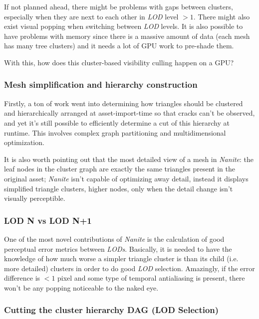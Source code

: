 \documentclass[10pt,journal,compsoc]{IEEEtran}
\begin{document}
\par If not planned ahead, there might be problems with gaps between clusters, especially when they are next to each other in \textit{LOD} level $>1$. There might also exist visual popping when switching between \textit{LOD} levels. It is also possible to have problems with memory since there is a massive amount of data (each mesh has many tree clusters) and it needs a lot of GPU work to pre-shade them. 
\par With this, how does this cluster-based visibility culling happen on a GPU?

\subsubsection{Mesh simplification and hierarchy construction}

\par Firstly, a ton of work went into determining how triangles should be clustered and hierarchically arranged at asset-import-time so that cracks can't be observed, and yet it's still possible to efficiently determine a cut of this hierarchy at runtime. This involves complex graph partitioning and multidimensional optimization. 

\par It is also worth pointing out that the most detailed view of a mesh in \textit{Nanite}: the leaf nodes in the cluster graph are exactly the same triangles present in the original asset; \textit{Nanite} isn't capable of optimizing away detail, instead it displays simplified triangle clusters, higher nodes, only when the detail change isn't visually perceptible.

\subsubsection{LOD N vs LOD N+1}

\par One of the most novel contributions of \textit{Nanite} is the calculation of good perceptual error metrics between \textit{LODs}. Basically, it is needed to have the knowledge of how much worse a simpler triangle cluster is than its child (i.e. more detailed) clusters in order to do good \textit{LOD} selection. Amazingly, if the error difference is $<1$ pixel and some type of temporal antialiasing is present, there won't be any popping noticeable to the naked eye.

\subsubsection{Cutting the cluster hierarchy DAG (LOD Selection)}
\end{document}
